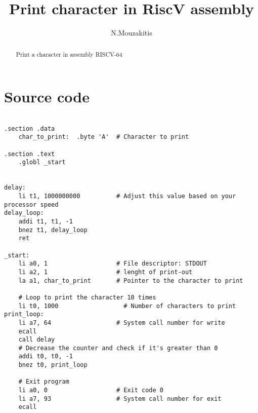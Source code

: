 \documentclass[a4paper,11pt]{article}
\title{Print character in RiscV assembly}
\author{N.Mouzakitis}
\begin{document}
\maketitle
\tableofcontents

\begin{abstract}
Print a character in assembly RISCV-64
\end{abstract}
\section {Source code}
     
    \begin{lstlisting}

.section .data
    char_to_print:  .byte 'A'  # Character to print

.section .text
    .globl _start


delay:
    li t1, 1000000000          # Adjust this value based on your processor speed
delay_loop:
    addi t1, t1, -1
    bnez t1, delay_loop
    ret

_start:
    li a0, 1                   # File descriptor: STDOUT
    li a2, 1                   # lenght of print-out
    la a1, char_to_print       # Pointer to the character to print

    # Loop to print the character 10 times
    li t0, 1000                  # Number of characters to print
print_loop:
    li a7, 64                  # System call number for write
    ecall
    call delay
	# Decrease the counter and check if it's greater than 0
    addi t0, t0, -1
    bnez t0, print_loop

    # Exit program
    li a0, 0                   # Exit code 0
    li a7, 93                  # System call number for exit
    ecall

\end{lstlisting}
\end{document}
